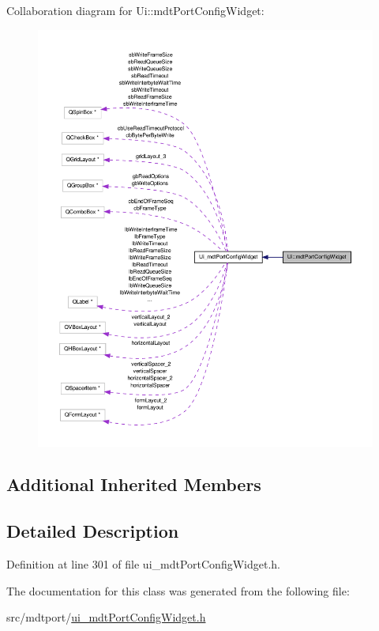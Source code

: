 Collaboration diagram for Ui\-:\-:mdt\-Port\-Config\-Widget\-:
\nopagebreak
\begin{figure}[H]
\begin{center}
\leavevmode
\includegraphics[width=350pt]{class_ui_1_1mdt_port_config_widget__coll__graph}
\end{center}
\end{figure}
\subsection*{Additional Inherited Members}


\subsection{Detailed Description}


Definition at line 301 of file ui\-\_\-mdt\-Port\-Config\-Widget.\-h.



The documentation for this class was generated from the following file\-:\begin{DoxyCompactItemize}
\item 
src/mdtport/\hyperlink{ui__mdt_port_config_widget_8h}{ui\-\_\-mdt\-Port\-Config\-Widget.\-h}\end{DoxyCompactItemize}
